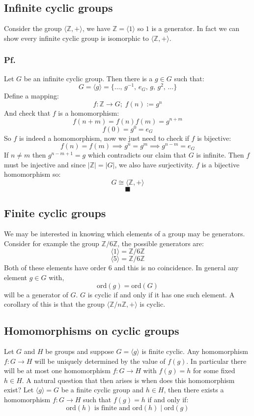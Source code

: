 \documentclass[12pt]{article}
\begin{document}
\subsection*{Infinite cyclic groups}
Consider the group \(\langle\mathbb{Z},+\rangle\), we have \(\mathbb{Z}=\langle 1\rangle\) so \(1\) is a generator. In fact we can show every infinite cyclic group is isomorphic to \(\langle\mathbb{Z},+\rangle\).
\subsubsection*{Pf.}
Let \(G\) be an infinite cyclic group. Then there is a \(g\in G\) such that:
\[G=\langle g\rangle =\{\dots,\,g^{-1},\,e_G,\,g,\,g^2,\,\dots\}\]
Define a mapping:
\[f:\mathbb{Z}\to G;\;f(n):=g^n\]
And check that \(f\) is a homomorphism:
\[f(n+m)=f(n)f(m)=g^{n+m}\]
\[f(0)=g^0=e_G\]
So \(f\) is indeed a homomorphism, now we just need to check if \(f\) is bijective:
\[f(n)=f(m)\implies g^n=g^m\implies g^{n-m}=e_G\]
If \(n\ne m\) then \(g^{n-m+1}=g\) which contradicts our claim that \(G\) is infinite. Then \(f\) must be injective and since \(|\mathbb{Z}|=|G|\), we also have surjectivity. \(f\) is a bijective homomorphism so:
\[G\cong \langle \mathbb{Z},+\rangle\]
\[\blacksquare\]
\subsection*{Finite cyclic groups}
We may be interested in knowing which elements of a group may be generators. Consider for example the group \(\mathbb{Z}/6\mathbb{Z}\), the possible generators are:
\[\langle 1\rangle=\mathbb{Z}/6\mathbb{Z}\]
\[\langle 5\rangle =\mathbb{Z}/6\mathbb{Z}\]
Both of these elements have order \(6\) and this is no coincidence. In general any element \(g\in G\) with,
\[\text{ord}(g)=\text{ord}(G)\]
will be a generator of \(G\). \(G\) is cyclic if and only if it has one such element. A corollary of this is that the group \(\langle\mathbb{Z}/n\mathbb{Z},+\rangle\) is cyclic.
\subsection*{Homomorphisms on cyclic groups}
Let \(G\) and \(H\) be groups and suppose \(G=\langle g\rangle\) is finite cyclic. Any homomorphism \(f:G\to H\) will be uniquely determined by the value of \(f(g)\). In particular there will be at most one homomorphism \(f:G\to H\) with \(f(g)=h\) for some fixed \(h\in H\). A natural question that then arises is when does this homomorphism exist? Let \(\langle g\rangle=G\) be a finite cyclic group and \(h\in H\), then there exists a homomorphism \(f:G\to H\) such that \(f(g)=h\) if and only if:
\[\text{ord}(h) \text{ is finite and ord}(h)\mid \text{ord}(g)\]
\end{document}
